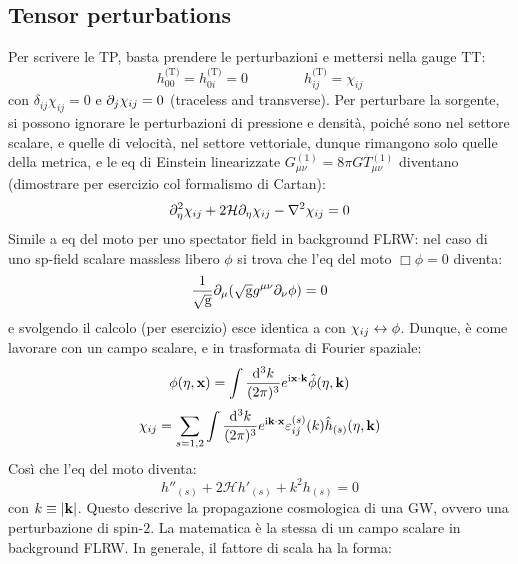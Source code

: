 \subsection{Tensor perturbations}

Per scrivere le TP, basta prendere le perturbazioni e mettersi nella gauge TT:
\begin{equation*}
  h^\text{(T)}_{00} = h^\text{(T)}_{0i} = 0
  \qquad \qquad
  h^\text{(T)}_{ij} = \chi_{ij}
\end{equation*}
con $ \delta_{ij} \chi_{ij} = 0 $ e $ \partial_j \chi_{ij} = 0 $ (traceless and transverse). Per perturbare la sorgente, si possono ignorare le perturbazioni di pressione e densità, poiché sono nel settore scalare, e quelle di velocità, nel settore vettoriale, dunque rimangono solo quelle della metrica, e le eq di Einstein linearizzate $ G^{(1)}_{\mu \nu} = 8 \pi G T^{(1)}_{\mu \nu} $ diventano (dimostrare per esercizio col formalismo di Cartan):
\begin{equation}
  \partial_\eta^2 \chi_{ij} + 2 \mathcal{H} \partial_\eta \chi_{ij} - \nabla^2 \chi_{ij} = 0
  \label{eq:tp}
\end{equation}
Simile a eq del moto per uno spectator field in background FLRW: nel caso di uno sp-field scalare massless libero $ \phi $ si trova che l'eq del moto $ \Box \phi = 0 $ diventa:
\begin{equation*}
  \frac{1}{\sqrt{\mathrm{g}}} \partial_\mu (\sqrt{\mathrm{g}} g^{\mu \nu} \partial_\nu \phi) = 0
\end{equation*}
e svolgendo il calcolo (per esercizio) esce identica a  con $ \chi_{ij} \leftrightarrow  \phi $. Dunque, è come lavorare con un campo scalare, e in trasformata di Fourier spaziale:
\begin{equation*}
  \phi(\eta , \mathbf{x}) = \int \frac{\mathrm{d}^3 k}{(2\pi)^3} e^{\mathrm{i} \mathbf{x} \cdot \mathbf{k}} \hat{\phi}(\eta , \mathbf{k})
\end{equation*}
\begin{equation}
  \chi_{ij} = \sum_{s = 1,2} \int \frac{\mathrm{d}^3k}{(2\pi)^3} e^{\mathrm{i} \mathbf{k} \cdot \mathbf{x}} \varepsilon_{ij}^{(s)}(k) \hat{h}_{(s)}(\eta,\mathbf{k})
\end{equation}
Così che l'eq del moto diventa:
\begin{equation*}
  h''_{(s)} + 2 \mathcal{H} h'_{(s)} + k^2 h_{(s)} = 0
\end{equation*}
con $ k \equiv \left\lvert\mathbf{k}\right\rvert $. Questo descrive la propagazione cosmologica di una GW, ovvero una perturbazione di spin-$ 2 $. La matematica è la stessa di un campo scalare in background FLRW. In generale, il fattore di scala ha la forma:
